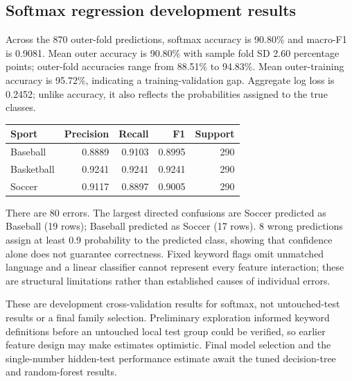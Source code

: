 \subsection{Softmax regression development results}
Across the 870 outer-fold predictions, softmax accuracy is 90.80\% and macro-F1 is 0.9081. Mean outer accuracy is 90.80\% with sample fold SD 2.60 percentage points; outer-fold accuracies range from 88.51\% to 94.83\%. Mean outer-training accuracy is 95.72\%, indicating a training-validation gap. Aggregate log loss is 0.2452; unlike accuracy, it also reflects the probabilities assigned to the true classes.

\begin{center}
\begin{tabular}{lrrrr}
\toprule
Sport & Precision & Recall & F1 & Support \\
\midrule
Baseball & 0.8889 & 0.9103 & 0.8995 & 290 \\
Basketball & 0.9241 & 0.9241 & 0.9241 & 290 \\
Soccer & 0.9117 & 0.8897 & 0.9005 & 290 \\
\bottomrule
\end{tabular}
\end{center}

There are 80 errors. The largest directed confusions are Soccer predicted as Baseball (19 rows); Baseball predicted as Soccer (17 rows). 8 wrong predictions assign at least 0.9 probability to the predicted class, showing that confidence alone does not guarantee correctness. Fixed keyword flags omit unmatched language and a linear classifier cannot represent every feature interaction; these are structural limitations rather than established causes of individual errors.

These are development cross-validation results for softmax, not untouched-test results or a final family selection. Preliminary exploration informed keyword definitions before an untouched local test group could be verified, so earlier feature design may make estimates optimistic. Final model selection and the single-number hidden-test performance estimate await the tuned decision-tree and random-forest results.

